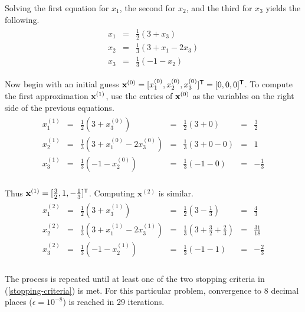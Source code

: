 Solving the first equation for $x_1$, the second for $x_2$, and the third for $x_3$ yields the following.
\begin{align*}
\begin{array}{ccc}
    x_1 & = & \frac{1}{2}(3 + x_3) \\
    x_2 & = & \frac{1}{3}(3 + x_1 - 2x_3) \\
    x_3 & = & \frac{1}{3}(-1 - x_2)
\end{array}
\end{align*}

Now begin with an initial guess $\mathbf{x}^{(0)} = [x^{(0)}_1, x^{(0)}_2, x^{(0)}_3]^{\mathsf T} = [0,0,0]^{\mathsf T}$.
To compute the first approximation $\mathbf{x}^{(1)}$, use the entries of $\mathbf{x}^{(0)}$ as the variables on the right side of the previous equations.
\begin{align*}
\begin{array}{ccccccr}
    x^{(1)}_1 & = & \frac{1}{2}(3 + x^{(0)}_3) & = & \frac{1}{2} (3 + 0) & = & \frac{3}{2} \\
    x^{(1)}_2 & = & \frac{1}{3}(3 + x^{(0)}_1 - 2x^{(0)}_3) & = & \frac{1}{3} (3 + 0 - 0) & = & 1 \\
    x^{(1)}_3 & = & \frac{1}{3}(-1 - x^{(0)}_2) & = & \frac{1}{3} (-1 - 0) & = & -\frac{1}{3} \\
\end{array}
\end{align*}

Thus $\mathbf{x}^{(1)} = [\frac{3}{2}, 1, -\frac{1}{3}]^{\mathsf T}$.
Computing $\mathbf{x}^{(2)}$ is similar.
\begin{align*}
\begin{array}{ccccccc}
x^{(2)}_1 & = & \frac{1}{2} ( 3 + x^{(1)}_3)  & = & \frac{1}{2} (3 - \frac{1}{3})     & = & \frac{4}{3} \\
x^{(2)}_2 & = & \frac{1}{3} ( 3 + x^{(1)}_1 - 2x^{(1)}_3) & = & \frac{1}{3} (3 + \frac{3}{2} + \frac{2}{3}) & = &  \frac{31}{18} \\
x^{(2)}_3 & = & \frac{1}{3} ( -1 - x^{(1)}_2)       & = & \frac{1}{3} (-1 - 1)    & = & -\frac{2}{3} \\
\end{array}
\end{align*}

The process is repeated until at least one of the two stopping criteria in (\ref{stopping-criteria}) is met.
For this particular problem, convergence to 8 decimal places ($\epsilon = 10^{-8}$) is reached in 29 iterations.

